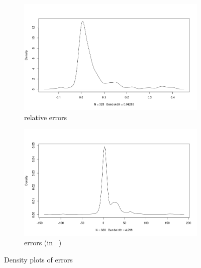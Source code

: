 \documentclass{article}
\begin{document}
\begin{figure}
  \centering
  \begin{subfigure}[t]{0.49\textwidth}
    \centering
    \includegraphics[width=\textwidth]{../io_memory_tests/plots/posterior_density_rel.png}
    \caption{relative errors}
  \end{subfigure}
  \begin{subfigure}[t]{0.49\textwidth}
    \centering
    \includegraphics[width=\textwidth]{../io_memory_tests/plots/posterior_density_errors.png}
    \caption{errors (in \si{\mebi\byte})}
  \end{subfigure}
  \caption{Density plots of errors}
  \label{fig:posterior_densities}
\end{figure}
\end{document}
